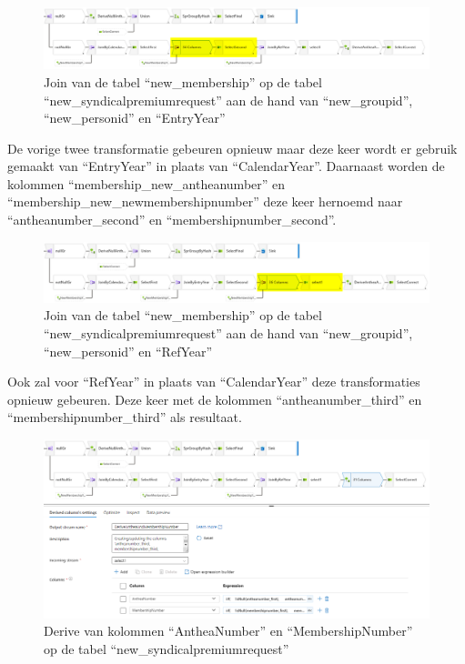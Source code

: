 \begin{figure}[H]
    \centering
    \includegraphics[width=1\textwidth]{./graphics/adf/member_5.png}
    \caption{Join van de tabel ``new\_membership'' op de tabel ``new\_syndicalpremiumrequest'' aan de hand van ``new\_groupid'', ``new\_personid'' en ``EntryYear''}
\end{figure}

De vorige twee transformatie gebeuren opnieuw maar deze keer wordt er gebruik gemaakt van ``EntryYear'' in plaats van ``CalendarYear''. Daarnaast worden de kolommen ``membership\_new\_antheanumber'' en ``membership\_new\_newmembershipnumber'' deze keer hernoemd naar ``antheanumber\_second'' en ``membershipnumber\_second''.

\begin{figure}[H]
    \centering
    \includegraphics[width=1\textwidth]{./graphics/adf/member_6.png}
    \caption{Join van de tabel ``new\_membership'' op de tabel ``new\_syndicalpremiumrequest'' aan de hand van ``new\_groupid'', ``new\_personid'' en ``RefYear''}
\end{figure}

Ook zal voor ``RefYear'' in plaats van ``CalendarYear'' deze transformaties opnieuw gebeuren. Deze keer met de kolommen ``antheanumber\_third'' en ``membershipnumber\_third'' als resultaat.

\begin{figure}[H]
    \centering
    \includegraphics[width=1\textwidth]{./graphics/adf/member_7.png}
    \caption{Derive van kolommen ``AntheaNumber'' en ``MembershipNumber'' op de tabel ``new\_syndicalpremiumrequest''}
\end{figure}

